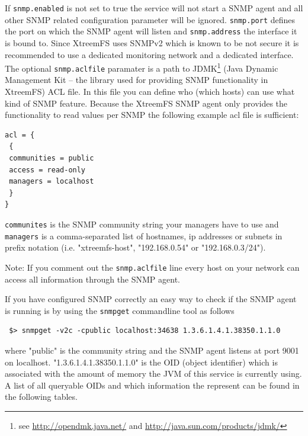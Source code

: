 \documentclass[a4paper,10pt]{book}
\begin{document}
If \texttt{snmp.enabled} is not set to true the service will not start a SNMP agent and all other SNMP related configuration parameter will be ignored.  \texttt{snmp.port} defines the port on which the SNMP agent will listen and \texttt{snmp.address} the interface it is bound to. Since XtreemFS uses SNMPv2 which is known to be not secure it is recommended to use a dedicated monitoring network and a dedicated interface. The optional \texttt{snmp.aclfile} paramater is a path to JDMK\footnote{see \url{http://opendmk.java.net/} and \url{http://java.sun.com/products/jdmk/}} (Java Dynamic Management Kit -- the library used for providing SNMP functionality in XtreemFS) ACL file. In this file you can define who (which hosts) can use what kind of SNMP feature. Because the XtreemFS SNMP agent only provides the functionality to read values per SNMP the following example acl file is sufficient:
\begin{verbatim}
acl = {
 {
 communities = public
 access = read-only
 managers = localhost
 }
}
\end{verbatim}
\texttt{communites} is the SNMP community string your managers have to use and \texttt{managers} is a comma-separated list of hostnames, ip addresses or subnets in prefix notation (i.e. "xtreemfs-host", "192.168.0.54" or "192.168.0.3/24").

Note: If you comment out the \texttt{snmp.aclfile} line every host on your network can access all information through the SNMP agent.

If you have configured SNMP correctly an easy way to check if the SNMP agent is running is by using the \texttt{snmpget} commandline tool as follows
\begin{verbatim}
 $> snmpget -v2c -cpublic localhost:34638 1.3.6.1.4.1.38350.1.1.0 
\end{verbatim}
where "public" is the community string and the SNMP agent listens at port 9001 on localhost. "1.3.6.1.4.1.38350.1.1.0" is the OID (object identifier) which is associated with the amount of memory the JVM of this service is currently using. A list of all queryable OIDs and which information the represent can be found in the following tables.
\end{document}
